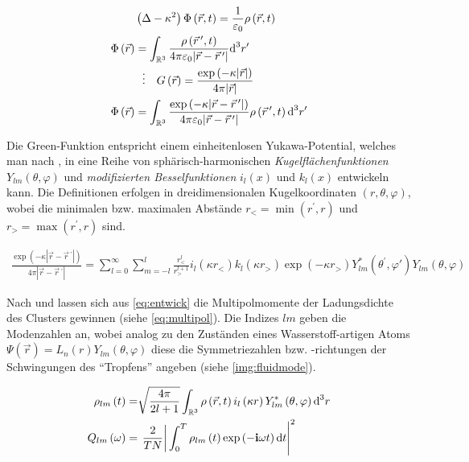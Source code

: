 \documentclass[numbers=noenddot,a4paper,notitlepage,twoside,BCOR15mm]{scrbook}
\newcommand{\diff}{\textnormal{d}}
\newcommand{\ix}[1]{_\text{#1}}
\newcommand{\imag}{\mathbf{i}}
\newcommand{\tilt}[1]{\textit{#1}}
\begin{document}
						\begin{align}
							&\left(\Delta-\kappa^2\right)\Phi\left(\vec{r},t\right)=\frac{1}{\varepsilon\ix{0}}\rho\left(\vec{r},t\right) \label{eq:poisson} \\
							\Phi\left(\vec{r}\right)&=\int_{\mathbb{R}^3}\frac{\rho\left(\vec{r}\,^\prime,t\right)}{4\pi\varepsilon\ix{0}|\vec{r}-\vec{r}\,^\prime|}\diff^{3}r^\prime \\
							&\,\,\,\,\vdots\quad G\left(\vec{r}\right)=\frac{\exp\left(-\kappa|\vec{r}|\right)}{4\pi|\vec{r}|} \label{eq:green}\\
							\Phi\left(\vec{r}\right)&=\int_{\mathbb{R}^3}\frac{\exp\left(-\kappa|\vec{r}-\vec{r}\,^\prime|\right)}{4\pi\varepsilon\ix{0}|\vec{r}-\vec{r}\,^\prime|}\rho\left(\vec{r}\,^\prime,t\right)\diff^{3}r^\prime \label{eq:fluid}
						\end{align}

					Die Green-Funktion entspricht einem einheitenlosen Yukawa-Potential, welches man nach \cite{Arfken05},\cite{Yap10} in eine Reihe von sphärisch-harmonischen \tilt{Kugelflächenfunktionen} $Y_{lm}\left(\theta,\varphi\right)$ und \tilt{modifizierten Besselfunktionen} $i_{l}\left(x\right)$ und $k_{l}\left(x\right)$ entwickeln kann. Die Definitionen erfolgen in dreidimensionalen Kugelkoordinaten $\left(r,\theta,\varphi\right)$, wobei die minimalen bzw. maximalen Abstände $r\ix{<}=\min\left(r^\prime,r\right)$ und $r\ix{>}=\max\left(r^\prime,r\right)$ sind.

						\begin{align}
							\frac{\exp\left(-\kappa|\vec{r}-\vec{r}\,^\prime|\right)}{4\pi|\vec{r}-\vec{r}\,^\prime|}=\sum_{l=0}^{\infty}\sum_{m=-l}^{l}\frac{r\ix{<}^l}{r\ix{>}^{l+1}}i_{l}\left(\kappa r\ix{<}\right)k_{l}\left(\kappa r\ix{>}\right)\exp\left(-\kappa r\ix{>}\right)Y_{lm}^*\left(\theta^\prime,\varphi\prime\right)Y_{lm}\left(\theta,\varphi\right) \label{eq:entwick}
						\end{align}

					Nach \cite{Ivanov09} und \cite{Schella13} lassen sich aus \autoref{eq:entwick} die Multipolmomente der Ladungsdichte des Clusters gewinnen (siehe \autoref{eq:multipol}). Die Indizes $lm$ geben die Modenzahlen an, wobei analog zu den Zust\"anden eines Wasserstoff-artigen Atoms $\Psi\left(\vec{r}\right)=L_{n}\left(r\right)Y_{lm}\left(\theta,\varphi\right)$ diese die Symmetriezahlen bzw. -richtungen der Schwingungen des "`Tropfens"' angeben (siehe \autoref{img:fluidmode}).

						\begin{align}
							\rho_{lm}\left(t\right)=&\sqrt{\frac{4\pi}{2l+1}}\int_{\mathbb{R}^{3}}\rho\left(\vec{r},t\right)i_{l}\left(\kappa r\right)Y^{*}_{lm}\left(\theta,\varphi\right)\diff^{3}r \label{eq:multipol} \\
							Q_{lm}\left(\omega\right)=&\left.\left.\frac{2}{TN}\right|\int_{0}^{T}\rho_{lm}\left(t\right)\exp\left(-\imag\omega t\right)\diff t\right|^{2}
						\end{align}
\end{document}

